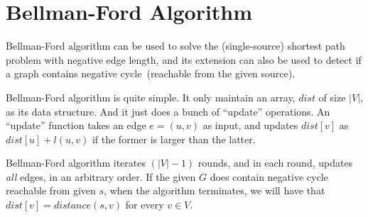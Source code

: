 \section*{Bellman-Ford Algorithm}

Bellman-Ford algorithm can be used to solve the (single-source) shortest path problem with negative edge length,
and its extension can also be used to detect if a graph contains negative cycle~(reachable from the given source).

Bellman-Ford algorithm is quite simple. It only maintain an array, 
$dist$ of size $|V|$, as its data structure. And it just does a bunch of ``update'' operations.
An ``update'' function takes an edge $e = (u,v)$ as input, and updates $dist[v]$ as $dist[u] + l(u,v)$ if
the former is larger than the latter.  

\begin{minipage}{0.8\textwidth}
	\xxx
	\xxx
	\xxx
	\xxx
	\xxx
\end{minipage}




Bellman-Ford algorithm iterates $(|V| - 1)$ rounds, and in each round, updates \emph{all} edges, in an arbitrary order.
If the given $G$ does contain negative cycle reachable from given $s$,
when the algorithm terminates, we will have that $dist[v] = distance(s,v)$ for every $v\in V$. 

\begin{minipage}{0.8\textwidth}
	\xxx
	\xxx
	\xxx
	\xxx
	\xxx
	\xxx
	\xxx
	\xxx
	\xxx
\end{minipage}

